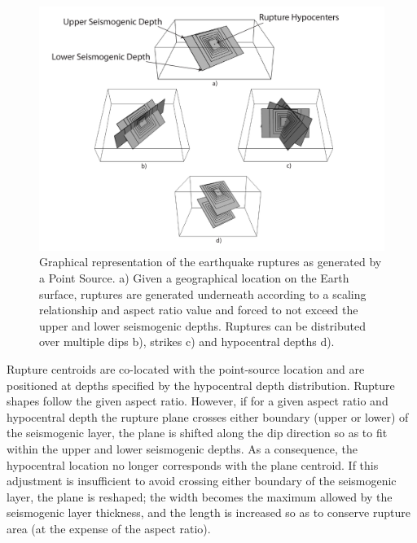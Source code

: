 \begin{figure}
\centering
\includegraphics[width=14cm]{./Pictures/PointSource.pdf}
\caption{Graphical representation of the earthquake ruptures as generated by a
Point Source. a) Given a geographical location on the Earth surface, ruptures
are generated underneath according to a scaling relationship and aspect ratio
value and forced to not exceed the upper and lower seismogenic depths. Ruptures
can be distributed over multiple dips b), strikes c) and hypocentral depths
d).}
\label{fig:PointSource}
\end{figure}
Rupture centroids are co-located with the point-source location and are
positioned at depths specified by the hypocentral depth distribution. Rupture
shapes follow the given aspect ratio. However, if for a given aspect ratio and
hypocentral depth the rupture plane crosses either boundary (upper or lower) of
the seismogenic layer, the plane is shifted along the dip direction so as to fit
within the upper and lower seismogenic depths. As a consequence, the hypocentral
location no longer corresponds with the plane centroid. If this adjustment is
insufficient to avoid crossing either boundary of the seismogenic layer, the
plane is reshaped; the width becomes the maximum allowed by the seismogenic
layer thickness, and the length is increased so as to conserve rupture area (at
the expense of the aspect ratio).

